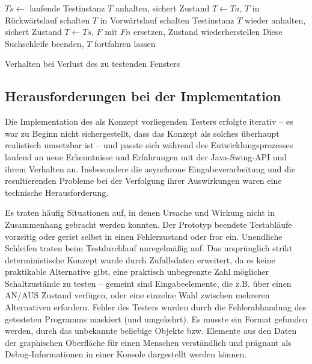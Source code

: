 \begin{algorithm} \SetAlgoLined
	$Ts \longleftarrow$ laufende Testinstanz $T$ anhalten, sichert Zustand\;
	$T \longleftarrow Ta$, $T$ in Rückwärtslauf schalten\;
	{
		{
			$T$ in Vorwärtslauf schalten\;
			Testinstanz $T$ wieder anhalten, sichert Zustand\;
			$T \longleftarrow Ts$, $F$ mit $Fn$ ersetzen, Zustand wiederherstellen\;
			Diese Suchschleife beenden, $T$ fortfahren lassen\;
		}
	}
	
	\caption{Verhalten bei Verlust des zu testenden Fensters}
	\label{alg:autotesterwindowloss}
\end{algorithm}


\subsection{Herausforderungen bei der Implementation}

Die Implementation des als Konzept vorliegenden Testers erfolgte iterativ
-- es war zu Beginn nicht sichergestellt, dass das Konzept als solches
überhaupt realistisch umsetzbar ist -- und passte sich während des
Entwicklungsprozesses laufend an neue Erkenntnisse und Erfahrungen
mit der Java-Swing-API und ihrem Verhalten an. Insbesondere
die asynchrone Eingabeverarbeitung und die resultierenden Probleme
bei der Verfolgung ihrer Auswirkungen waren eine technische Herausforderung.

Es traten häufig Situationen auf, in denen Ursache und Wirkung nicht
in Zusammenhang gebracht werden konnten. Der Prototyp beendete
Testabläufe vorzeitig oder geriet selbst in einen Fehlerzustand
oder fror ein. Unendliche Schleifen traten beim Testdurchlauf unregelmäßig auf.
Das ursprünglich strikt deterministische Konzept wurde durch Zufallsdaten
erweitert, da es keine praktikable Alternative gibt, eine praktisch
unbegrenzte Zahl möglicher Schaltzustände zu testen -- gemeint
sind Eingabeelemente, die z.B. über einen AN/AUS Zustand verfügen,
oder eine einzelne Wahl zwischen mehreren Alternativen erfordern.
Fehler des Testers wurden durch die Fehlerabhandung des getesteten
Programms maskiert (und umgekehrt). Es musste ein Format gefunden
werden, durch das unbekannte beliebige Objekte bzw. Elemente aus den Daten
der graphischen Oberfläche für einen Menschen verständlich und prägnant
als Debug-Informationen in einer Konsole dargestellt werden können.

